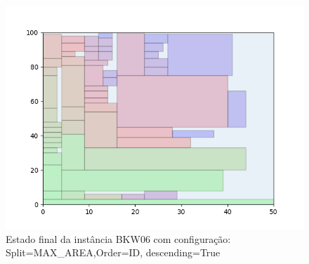 \begin{figure}[H]
    \centering
    \caption[]{Estado final da instância BKW06 com configuração: Split=MAX_AREA,Order=ID, descending=True}
    \label{fig:bkw06-max_area-id-true}
    \includegraphics[scale=0.5]{output/figures/bkw/bkw06/max_area/id/true/00}
\end{figure}